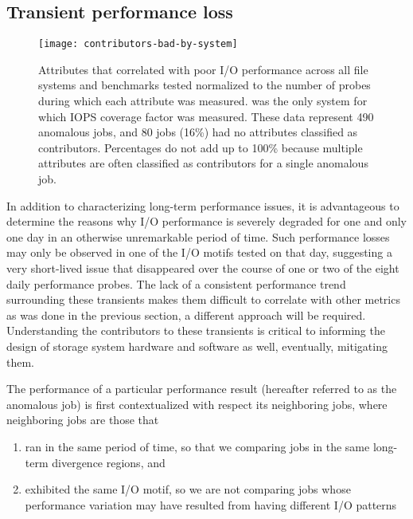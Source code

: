 




\subsection{Transient performance loss} \label{sec:results/shortterm}

\begin{figure}
    \centering
    \texttt{[image: contributors-bad-by-system]}
    \vspace{-.35in}
    \caption{Attributes that correlated with poor I/O performance across all file systems and benchmarks tested normalized to the number of probes during which each attribute was measured.
    \mira was the only system for which IOPS coverage factor was measured. 
    These data represent 490 anomalous jobs, and 80 jobs (16\%) had no attributes classified as contributors.
    Percentages do not add up to 100\% because multiple attributes are often classified as contributors for a single anomalous job.
    }
    \label{fig:contributors-bad-by-system}
\end{figure}

In addition to characterizing long-term performance issues, it is advantageous to determine the reasons why I/O performance is severely degraded for one and only one day in an otherwise unremarkable period of time.
Such performance losses may only be observed in one of the I/O motifs tested on that day, suggesting a very short-lived issue that disappeared over the course of one or two of the eight daily performance probes.
The lack of a consistent performance trend surrounding these transients makes them difficult to correlate with other metrics as was done in the previous section, a different approach will be required.
Understanding the contributors to these transients is critical to informing the design of storage system hardware and software as well, eventually, mitigating them. 

The performance of a particular performance result (hereafter referred to as the anomalous job) is first contextualized with respect its neighboring jobs, where neighboring jobs are those that
\begin{enumerate}[leftmargin=*]
\item ran in the same period of time, so that we comparing jobs in the same long-term divergence regions, and
\item exhibited the same I/O motif, so we are not comparing jobs whose performance variation may have resulted from having different I/O patterns
\end{enumerate}

